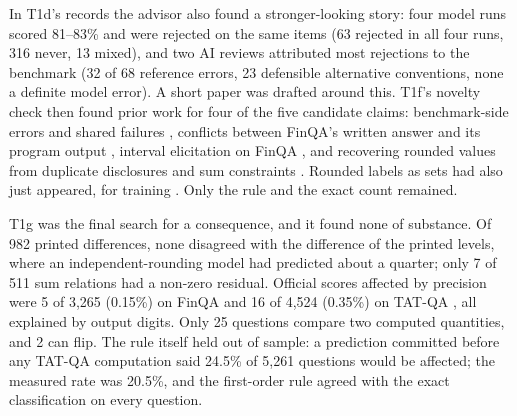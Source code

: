 \documentclass[11pt]{article}
\begin{document}
In T1d's records the advisor also found a stronger-looking story: four model runs scored 81--83\% and were rejected on the same items (63 rejected in all four runs, 316 never, 13 mixed), and two AI reviews attributed most rejections to the benchmark (32 of 68 reference errors, 23 defensible alternative conventions, none a definite model error). A short paper was drafted around this. T1f's novelty check then found prior work for four of the five candidate claims: benchmark-side errors and shared failures \citep{tang2025financereasoning,finesse2026}, conflicts between FinQA's written answer and its program output \citep{envcommons2026pr4}, interval elicitation on FinQA \citep{bahaj2025gauging}, and recovering rounded values from duplicate disclosures and sum constraints \citep{xbrl2023calc,dandekar2010ineffectiveness}. Rounded labels as sets had also just appeared, for training \citep{yan2026training}. Only the rule and the exact count remained.

T1g was the final search for a consequence, and it found none of substance. Of 982 printed differences, none disagreed with the difference of the printed levels, where an independent-rounding model had predicted about a quarter; only 7 of 511 sum relations had a non-zero residual. Official scores affected by precision were 5 of 3,265 (0.15\%) on FinQA and 16 of 4,524 (0.35\%) on TAT-QA \citep{zhu-etal-2021-tat}, all explained by output digits. Only 25 questions compare two computed quantities, and 2 can flip. The rule itself held out of sample: a prediction committed before any TAT-QA computation said 24.5\% of 5,261 questions would be affected; the measured rate was 20.5\%, and the first-order rule agreed with the exact classification on every question.
\end{document}
